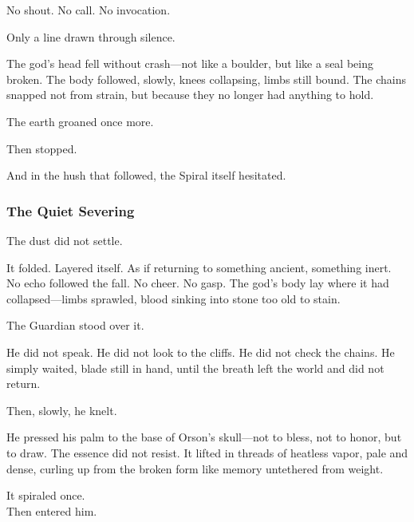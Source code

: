 \documentclass[12pt]{article}
\begin{document}
\vspace{0.5em}
No shout. No call. No invocation.

\vspace{0.5em}
Only a line drawn through silence.

\vspace{0.5em}
The god’s head fell without crash---not like a boulder, but like a seal being broken. The body followed, slowly, knees collapsing, limbs still bound. The chains snapped not from strain, but because they no longer had anything to hold.

\vspace{0.5em}
The earth groaned once more.

\vspace{0.5em}
Then stopped.

\vspace{0.5em}
And in the hush that followed, the Spiral itself hesitated.


\dotfill

\subsubsection*{The Quiet Severing}

The dust did not settle.

\vspace{0.5em}
It folded. Layered itself. As if returning to something ancient, something inert. No echo followed the fall. No cheer. No gasp. The god’s body lay where it had collapsed---limbs sprawled, blood sinking into stone too old to stain.

\vspace{0.5em}
The Guardian stood over it.

\vspace{0.5em}
He did not speak. He did not look to the cliffs. He did not check the chains. He simply waited, blade still in hand, until the breath left the world and did not return.

\vspace{0.5em}
Then, slowly, he knelt.

\vspace{0.5em}
He pressed his palm to the base of Orson’s skull---not to bless, not to honor, but to draw. The essence did not resist. It lifted in threads of heatless vapor, pale and dense, curling up from the broken form like memory untethered from weight.

\vspace{0.5em}
It spiraled once.\\
Then entered him.
\end{document}
